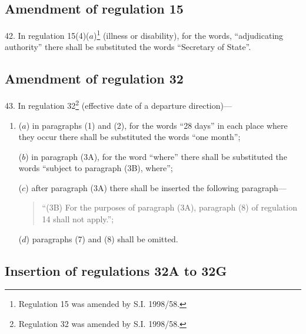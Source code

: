 \documentclass[12pt,a4paper]{article}
\begin{document}
\subsection[42. Amendment of regulation 15]{Amendment of regulation 15}

42.  In regulation 15(4)($a$)\footnote{\frenchspacing Regulation 15 was amended by S.I. 1998/58.} (illness or disability), for the words, “adjudicating authority” there shall be substituted the words “Secretary of State”.

\subsection[43. Amendment of regulation 32]{Amendment of regulation 32}

43.  In regulation 32\footnote{\frenchspacing Regulation 32 was amended by S.I. 1998/58.} (effective date of a departure direction)---
\begin{enumerate}\item[]
($a$) in paragraphs (1) and (2), for the words “28 days” in each place where they occur there shall be substituted the words “one month”;

($b$) in paragraph (3A), for the word “where” there shall be substituted the words “subject to paragraph (3B), where”;

($c$) after paragraph (3A) there shall be inserted the following paragraph—
\begin{quotation}
“(3B) For the purposes of paragraph (3A), paragraph (8) of regulation 14 shall not apply.”;
\end{quotation}

($d$) paragraphs (7) and (8) shall be omitted.
\end{enumerate}

\subsection[44. Insertion of regulations 32A to 32G]{Insertion of regulations 32A to 32G}
\end{document}
